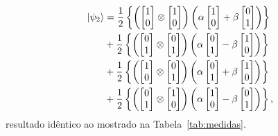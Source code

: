 \begin{equation}\label{eq:final}
  \begin{split}
\ket{\psi_2} &=\frac{1}{2} \left\{ \left(\begin{bmatrix}
1 \\
0
\end{bmatrix} \otimes \begin{bmatrix}
1 \\
0
\end{bmatrix}\right) \left(\alpha \begin{bmatrix}
1 \\
0
\end{bmatrix} + \beta \begin{bmatrix}
0 \\
1
\end{bmatrix}\right)\right\} \nonumber \\
&+\frac{1}{2} \left\{ \left(\begin{bmatrix}
0 \\
1
\end{bmatrix} \otimes \begin{bmatrix}
0 \\
1
\end{bmatrix}\right) \left(\alpha \begin{bmatrix}
0 \\
1
\end{bmatrix} - \beta \begin{bmatrix}
1 \\
0
\end{bmatrix}\right)\right\} \nonumber \\
&+\frac{1}{2} \left\{\left( \begin{bmatrix}
1 \\
0
\end{bmatrix} \otimes \begin{bmatrix}
0 \\
1
\end{bmatrix}\right) \left(\alpha \begin{bmatrix}
0 \\
1
\end{bmatrix} + \beta \begin{bmatrix}
1 \\
0
\end{bmatrix}\right)\right\} \nonumber \\
&+\frac{1}{2} \left\{ \left( \begin{bmatrix}
0 \\
1
\end{bmatrix} \otimes \begin{bmatrix}
1 \\
0
\end{bmatrix}\right) \left(\alpha \begin{bmatrix}
1 \\
0
\end{bmatrix} - \beta \begin{bmatrix}
0 \\
1
\end{bmatrix}\right) \right\},
  \end{split}
\end{equation}
resultado idêntico ao mostrado na Tabela~\ref{tab:medidas}.

